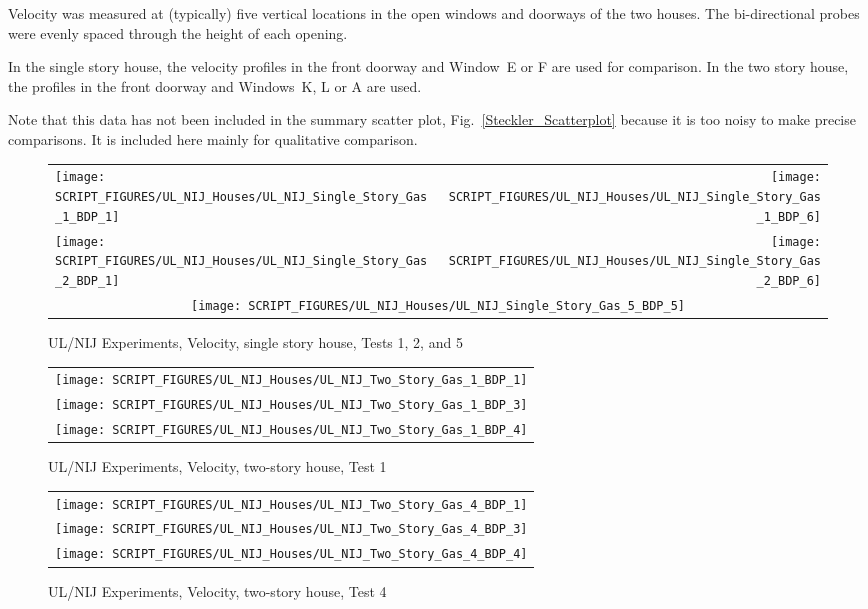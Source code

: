 Velocity was measured at (typically) five vertical locations in the open windows and doorways of the two houses. The bi-directional probes were evenly spaced through the height of each opening.

In the single story house, the velocity profiles in the front doorway and Window~E or F are used for comparison. In the two story house, the profiles in the front doorway and Windows~K, L or A are used.

Note that this data has not been included in the summary scatter plot, Fig.~\ref{Steckler_Scatterplot} because it is too noisy to make precise comparisons. It is included here mainly for qualitative comparison.

\begin{figure}[p]
\begin{tabular*}{\textwidth}{l@{\extracolsep{\fill}}r}
\texttt{[image: SCRIPT\_FIGURES/UL\_NIJ\_Houses/UL\_NIJ\_Single\_Story\_Gas\_1\_BDP\_1]} &
\texttt{[image: SCRIPT\_FIGURES/UL\_NIJ\_Houses/UL\_NIJ\_Single\_Story\_Gas\_1\_BDP\_6]} \\
\texttt{[image: SCRIPT\_FIGURES/UL\_NIJ\_Houses/UL\_NIJ\_Single\_Story\_Gas\_2\_BDP\_1]} &
\texttt{[image: SCRIPT\_FIGURES/UL\_NIJ\_Houses/UL\_NIJ\_Single\_Story\_Gas\_2\_BDP\_6]} \\
\multicolumn{2}{c}{\texttt{[image: SCRIPT\_FIGURES/UL\_NIJ\_Houses/UL\_NIJ\_Single\_Story\_Gas\_5\_BDP\_5]}}
\end{tabular*}
\caption{UL/NIJ Experiments, Velocity, single story house, Tests 1, 2, and 5}
\label{UL_NIJ_Vel_Ranch_123}
\end{figure}

\begin{figure}[p]
\begin{center}
\begin{tabular}{c}
\texttt{[image: SCRIPT\_FIGURES/UL\_NIJ\_Houses/UL\_NIJ\_Two\_Story\_Gas\_1\_BDP\_1]} \\
\texttt{[image: SCRIPT\_FIGURES/UL\_NIJ\_Houses/UL\_NIJ\_Two\_Story\_Gas\_1\_BDP\_3]} \\
\texttt{[image: SCRIPT\_FIGURES/UL\_NIJ\_Houses/UL\_NIJ\_Two\_Story\_Gas\_1\_BDP\_4]}
\end{tabular}
\end{center}
\caption{UL/NIJ Experiments, Velocity, two-story house, Test 1}
\label{UL_NIJ_Vel_Colonial_1}
\end{figure}

\begin{figure}[p]
\begin{center}
\begin{tabular}{c}
\texttt{[image: SCRIPT\_FIGURES/UL\_NIJ\_Houses/UL\_NIJ\_Two\_Story\_Gas\_4\_BDP\_1]} \\
\texttt{[image: SCRIPT\_FIGURES/UL\_NIJ\_Houses/UL\_NIJ\_Two\_Story\_Gas\_4\_BDP\_3]} \\
\texttt{[image: SCRIPT\_FIGURES/UL\_NIJ\_Houses/UL\_NIJ\_Two\_Story\_Gas\_4\_BDP\_4]}
\end{tabular}
\end{center}
\caption{UL/NIJ Experiments, Velocity, two-story house, Test 4}
\label{UL_NIJ_Vel_Colonial_4}
\end{figure}

